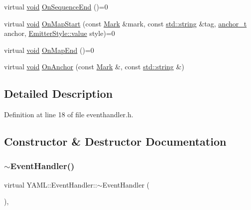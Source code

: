 \begin{DoxyCompactItemize}
\item 
virtual \mbox{\hyperlink{glad_8h_a950fc91edb4504f62f1c577bf4727c29}{void}} \mbox{\hyperlink{class_y_a_m_l_1_1_event_handler_a8b36cc36cd7067175b80b5d047aafaf3}{On\+Sequence\+End}} ()=0
\item 
virtual \mbox{\hyperlink{glad_8h_a950fc91edb4504f62f1c577bf4727c29}{void}} \mbox{\hyperlink{class_y_a_m_l_1_1_event_handler_a57fc2477cb1f4fd3a650e41180e6f9b6}{On\+Map\+Start}} (const \mbox{\hyperlink{struct_y_a_m_l_1_1_mark}{Mark}} \&mark, const \mbox{\hyperlink{glad_8h_ac83513893df92266f79a515488701770}{std\+::string}} \&tag, \mbox{\hyperlink{namespace_y_a_m_l_abeff1798814ae3402fc5665fdcad1de6}{anchor\+\_\+t}} anchor, \mbox{\hyperlink{struct_y_a_m_l_1_1_emitter_style_ae86640662c85ce6062a37f9636b6959f}{Emitter\+Style\+::value}} style)=0
\item 
virtual \mbox{\hyperlink{glad_8h_a950fc91edb4504f62f1c577bf4727c29}{void}} \mbox{\hyperlink{class_y_a_m_l_1_1_event_handler_a6b8821803de4ecca96a05c3296fb565f}{On\+Map\+End}} ()=0
\item 
virtual \mbox{\hyperlink{glad_8h_a950fc91edb4504f62f1c577bf4727c29}{void}} \mbox{\hyperlink{class_y_a_m_l_1_1_event_handler_a6abc848eb0289f32ec97a00ac52b392c}{On\+Anchor}} (const \mbox{\hyperlink{struct_y_a_m_l_1_1_mark}{Mark}} \&, const \mbox{\hyperlink{glad_8h_ac83513893df92266f79a515488701770}{std\+::string}} \&)
\end{DoxyCompactItemize}


\subsection{Detailed Description}


Definition at line 18 of file eventhandler.\+h.



\subsection{Constructor \& Destructor Documentation}
\mbox{\label{class_y_a_m_l_1_1_event_handler_a4be5c33c3f362dd80d56475acff1268a}} 
\subsubsection{\texorpdfstring{$\sim$EventHandler()}{~EventHandler()}}
{\footnotesize\ttfamily virtual Y\+A\+M\+L\+::\+Event\+Handler\+::$\sim$\+Event\+Handler (\begin{DoxyParamCaption}{ }\end{DoxyParamCaption})\hspace{0.3cm}{\ttfamily [inline]}, {\ttfamily [virtual]}}



